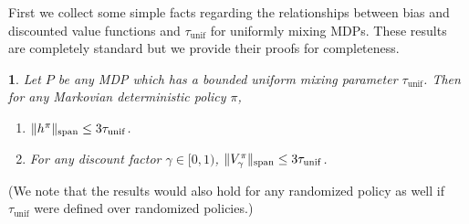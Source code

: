\documentclass{article}
\theoremstyle{plain}
\theoremstyle{plain}
\newtheorem{lem}[thm]{\protect\lemmaname}
\theoremstyle{remark}
\theoremstyle{plain}
\theoremstyle{plain}
\providecommand{\lemmaname}{Lemma}
\newcommand{\tmix}{\tau_{\mathrm{unif}}}
\begin{document}
First we collect some simple facts regarding the relationships between bias and discounted value functions and $\tmix$ for uniformly mixing MDPs. These results are completely standard but we provide their proofs for completeness.
\begin{lem}
    \label{lem:mixing_param_relationships}
    Let $P$ be any MDP which has a bounded uniform mixing parameter $\tmix$. Then for any Markovian deterministic policy $\pi$,
    \begin{enumerate}
        \item $\spannorm{h^\pi} \leq 3\tmix$.
        \item For any discount factor $\gamma \in [0,1)$, $\spannorm{V_\gamma^\pi} \leq 3 \tmix$.
    \end{enumerate}
\end{lem}
(We note that the results would also hold for any randomized policy as well if $\tmix$ were defined over randomized policies.)
\end{document}
